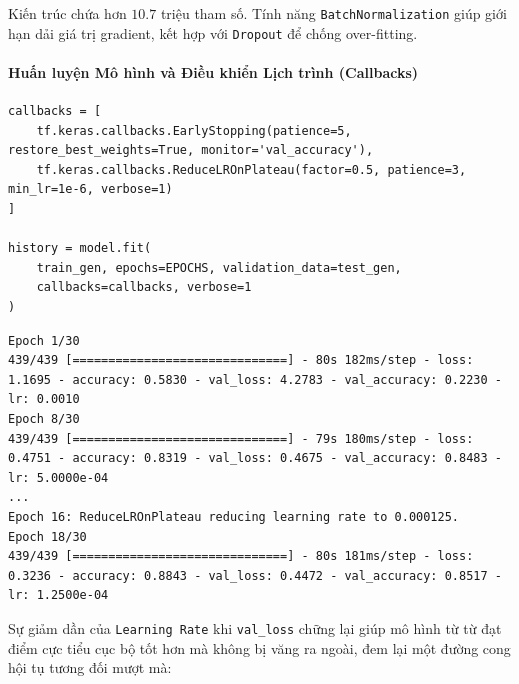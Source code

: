 Kiến trúc chứa hơn $10.7$ triệu tham số. Tính năng \texttt{BatchNormalization} giúp giới hạn dải giá trị gradient, kết hợp với \texttt{Dropout} để chống over-fitting.

\paragraph{Huấn luyện Mô hình và Điều khiển Lịch trình (Callbacks)} \hfill\mbox{}

\begin{lstlisting}[style=pythoncode, caption={Bắt đầu quá trình Huấn luyện với Callbacks}]
callbacks = [
    tf.keras.callbacks.EarlyStopping(patience=5, restore_best_weights=True, monitor='val_accuracy'),
    tf.keras.callbacks.ReduceLROnPlateau(factor=0.5, patience=3, min_lr=1e-6, verbose=1)
]

history = model.fit(
    train_gen, epochs=EPOCHS, validation_data=test_gen,
    callbacks=callbacks, verbose=1
)
\end{lstlisting}

\begin{lstlisting}[style=consoleoutput, caption={Output: Quá trình Fit theo các Epochs}]
Epoch 1/30
439/439 [==============================] - 80s 182ms/step - loss: 1.1695 - accuracy: 0.5830 - val_loss: 4.2783 - val_accuracy: 0.2230 - lr: 0.0010
Epoch 8/30
439/439 [==============================] - 79s 180ms/step - loss: 0.4751 - accuracy: 0.8319 - val_loss: 0.4675 - val_accuracy: 0.8483 - lr: 5.0000e-04
...
Epoch 16: ReduceLROnPlateau reducing learning rate to 0.000125.
Epoch 18/30
439/439 [==============================] - 80s 181ms/step - loss: 0.3236 - accuracy: 0.8843 - val_loss: 0.4472 - val_accuracy: 0.8517 - lr: 1.2500e-04
\end{lstlisting}

Sự giảm dần của \texttt{Learning Rate} khi \texttt{val\_loss} chững lại giúp mô hình từ từ đạt điểm cực tiểu cục bộ tốt hơn mà không bị văng ra ngoài, đem lại một đường cong hội tụ tương đối mượt mà:

